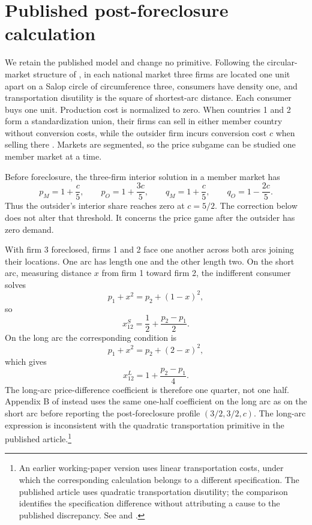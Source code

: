 \section{Published post-foreclosure calculation}\label{sec:calculation}

We retain the published model and change no primitive. Following the circular-market structure of \citet{salop1979}, in each national market three firms are located one unit apart on a Salop circle of circumference three, consumers have density one, and transportation disutility is the square of shortest-arc distance. Each consumer buys one unit. Production cost is normalized to zero. When countries 1 and 2 form a standardization union, their firms can sell in either member country without conversion costs, while the outsider firm incurs conversion cost $c$ when selling there \citep[pp.~367--368, 373--374]{gandalshy2001}. Markets are segmented, so the price subgame can be studied one member market at a time.

Before foreclosure, the three-firm interior solution in a member market has
\begin{equation}\label{eq:interior-su}
 p_M=1+\frac{c}{5},\qquad p_O=1+\frac{3c}{5},\qquad
 q_M=1+\frac{c}{5},\qquad q_O=1-\frac{2c}{5}.
\end{equation}
Thus the outsider's interior share reaches zero at $c=5/2$. The correction below does not alter that threshold. It concerns the price game after the outsider has zero demand.

With firm 3 foreclosed, firms 1 and 2 face one another across both arcs joining their locations. One arc has length one and the other length two. On the short arc, measuring distance $x$ from firm 1 toward firm 2, the indifferent consumer solves
\[
 p_1+x^2=p_2+(1-x)^2,
\]
so
\begin{equation}\label{eq:shortarc}
 x_{12}^{S}=\frac12+\frac{p_2-p_1}{2}.
\end{equation}
On the long arc the corresponding condition is
\[
 p_1+x^2=p_2+(2-x)^2,
\]
which gives
\begin{equation}\label{eq:longarc}
 x_{12}^{L}=1+\frac{p_2-p_1}{4}.
\end{equation}
The long-arc price-difference coefficient is therefore one quarter, not one half. Appendix B of \citet[pp.~381--382]{gandalshy2001} instead uses the same one-half coefficient on the long arc as on the short arc before reporting the post-foreclosure profile $(3/2,3/2,c)$. The long-arc expression is inconsistent with the quadratic transportation primitive in the published article.\footnote{An earlier working-paper version uses linear transportation costs, under which the corresponding calculation belongs to a different specification. The published article uses quadratic transportation disutility; the comparison identifies the specification difference without attributing a cause to the published discrepancy. See \citet{gandalshy1996} and \citet[pp.~367--368]{gandalshy2001}.}

